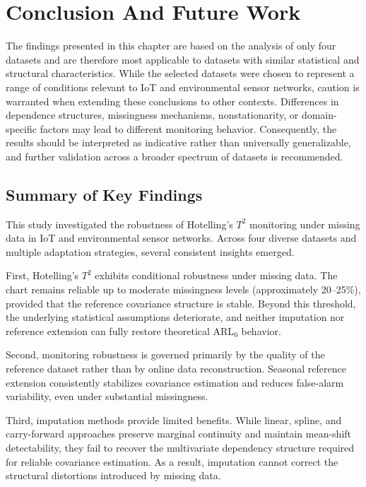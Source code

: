 \clearpage
\section{Conclusion And Future Work}

\noindent The findings presented in this chapter are based on the analysis of only four datasets and are therefore most applicable to datasets with similar statistical and structural characteristics. While the selected datasets were chosen to represent a range of conditions relevant to IoT and environmental sensor networks, caution is warranted when extending these conclusions to other contexts. Differences in dependence structures, missingness mechanisms, nonstationarity, or domain-specific factors may lead to different monitoring behavior. Consequently, the results should be interpreted as indicative rather than universally generalizable, and further validation across a broader spectrum of datasets is recommended.

\subsection{Summary of Key Findings}

This study investigated the robustness of Hotelling’s $T^2$ monitoring under missing data in \ac{IoT} and environmental sensor networks. Across four diverse datasets and multiple adaptation strategies, several consistent insights emerged.

First, Hotelling’s $T^2$ exhibits conditional robustness under missing data. The chart remains reliable up to moderate missingness levels (approximately 20--25\%), provided that the reference covariance structure is stable. Beyond this threshold, the underlying statistical assumptions deteriorate, and neither imputation nor reference extension can fully restore theoretical \ac{ARL}$_0$ behavior.

Second, monitoring robustness is governed primarily by the quality of the reference dataset rather than by online data reconstruction. Seasonal reference extension consistently stabilizes covariance estimation and reduces false-alarm variability, even under substantial missingness.

Third, imputation methods provide limited benefits. While linear, spline, and carry-forward approaches preserve marginal continuity and maintain mean-shift detectability, they fail to recover the multivariate dependency structure required for reliable covariance estimation. As a result, imputation cannot correct the structural distortions introduced by missing data.

